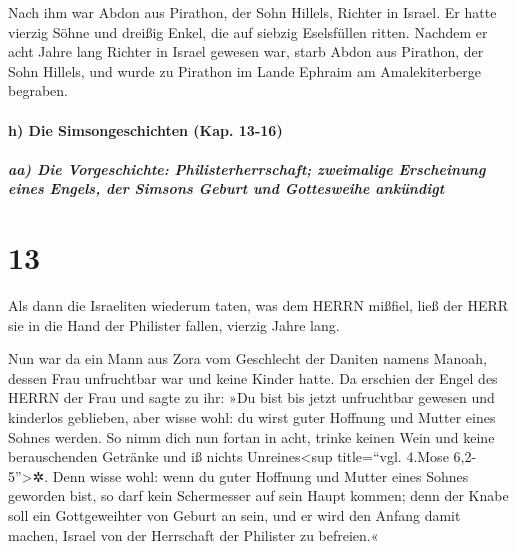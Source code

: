 Nach ihm war Abdon aus Pirathon, der Sohn Hillels,
Richter in Israel. Er hatte vierzig Söhne und dreißig
Enkel, die auf siebzig Eselsfüllen ritten. Nachdem er acht Jahre lang
Richter in Israel gewesen war, starb Abdon aus Pirathon,
der Sohn Hillels, und wurde zu Pirathon im Lande Ephraim am
Amalekiterberge begraben.

\hypertarget{h-die-simsongeschichten-kap.-13-16}{%
\paragraph{h) Die Simsongeschichten (Kap.
13-16)}\label{h-die-simsongeschichten-kap.-13-16}}

\hypertarget{aa-die-vorgeschichte-philisterherrschaft-zweimalige-erscheinung-eines-engels-der-simsons-geburt-und-gottesweihe-ankuxfcndigt}{%
\subparagraph{aa) Die Vorgeschichte: Philisterherrschaft; zweimalige
Erscheinung eines Engels, der Simsons Geburt und Gottesweihe
ankündigt}\label{aa-die-vorgeschichte-philisterherrschaft-zweimalige-erscheinung-eines-engels-der-simsons-geburt-und-gottesweihe-ankuxfcndigt}}

\hypertarget{section-12}{%
\section{13}\label{section-12}}

Als dann die Israeliten wiederum taten, was dem HERRN
mißfiel, ließ der HERR sie in die Hand der Philister fallen, vierzig
Jahre lang.

Nun war da ein Mann aus Zora vom Geschlecht der Daniten
namens Manoah, dessen Frau unfruchtbar war und keine Kinder hatte.
Da erschien der Engel des HERRN der Frau und sagte zu ihr:
»Du bist bis jetzt unfruchtbar gewesen und kinderlos geblieben, aber
wisse wohl: du wirst guter Hoffnung und Mutter eines Sohnes werden.
So nimm dich nun fortan in acht, trinke keinen Wein und
keine berauschenden Getränke und iß nichts Unreines\textless sup
title=``vgl. 4.Mose 6,2-5''\textgreater✲. Denn wisse wohl:
wenn du guter Hoffnung und Mutter eines Sohnes geworden bist, so darf
kein Schermesser auf sein Haupt kommen; denn der Knabe soll ein
Gottgeweihter von Geburt an sein, und er wird den Anfang damit machen,
Israel von der Herrschaft der Philister zu befreien.«

